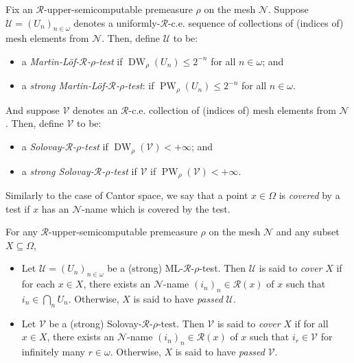 \begin{definition}
    Fix an $\mathscr{R}$-upper-semicomputable premeasure $\rho$ on the mesh $\mathcal{N}$. Suppose $\mathcal{U} = (U_n)_{n \in \omega}$ denotes a uniformly-$\mathscr{R}$-c.e. sequence of collections of (indices of) mesh elements from $\mathcal{N}$. Then, define $\mathcal{U}$ to be:
    \begin{itemize}
        \item a \textit{Martin-L{\"o}f-$\mathscr{R}$-$\rho$-test} if $\operatorname{DW}_\rho(U_n) \leq 2^{-n}$ for all $n \in \omega$; and
        \item a \textit{strong Martin-L{\"o}f-$\mathscr{R}$-$\rho$-test}: if $\operatorname{PW}_\rho(U_n) \leq 2^{-n}$ for all $n \in \omega$.
    \end{itemize}
    And suppose $\mathcal{V}$ denotes an $\mathscr{R}$-c.e. collection of (indices of) mesh elements from $\mathcal{N}$. Then, define $\mathcal{V}$ to be:
    \begin{itemize}
        \item a \textit{Solovay-$\mathscr{R}$-$\rho$-test} if $\operatorname{DW}_\rho(\mathcal{V}) < + \infty$; and
        \item a \textit{strong Solovay-$\mathscr{R}$-$\rho$-test} if $\mathcal{V}$ if $\operatorname{PW}_\rho(\mathcal{V}) < + \infty$.
    \end{itemize}
\end{definition}

Similarly to the case of Cantor space, we say that a point $x \in \Omega$ is \textit{covered} by a test if $x$ has an $\mathcal{N}$-name which is covered by the test.

\begin{definition}
    For any $\mathscr{R}$-upper-semicomputable premeasure $\rho$ on the mesh $\mathcal{N}$ and any subset $X \subseteq \Omega$,
    \begin{itemize}
        \item Let $\mathcal{U} = (U_n)_{n \in \omega}$ be a (strong) ML-$\mathscr{R}$-$\rho$-test. Then $\mathcal{U}$ is said to \textit{cover} $X$ if for each $x \in X$, there exists an $\mathcal{N}$-name $(i_n)_n \in \mathcal{R}(x)$ of $x$ such that $i_n \in \bigcap_n U_n$. Otherwise, $X$ is said to have \textit{passed} $\mathcal{U}$.
        \item Let $\mathcal{V}$ be a (strong) Solovay-$\mathscr{R}$-$\rho$-test. Then $\mathcal{V}$ is said to \textit{cover} $X$ if for all $x \in X$, there exists an $\mathcal{N}$-name $(i_n)_n \in \mathcal{R}(x)$ of $x$ such that $i_r \in \mathcal{V}$ for infinitely many $r \in \omega$. Otherwise, $X$ is said to have \textit{passed} $\mathcal{V}$.
    \end{itemize}
\end{definition}

